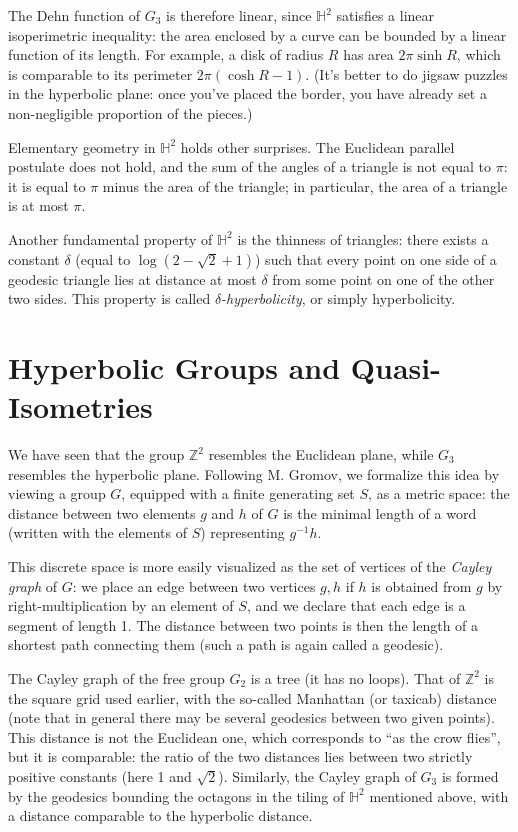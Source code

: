 \documentclass{amsart}
\begin{document}
The Dehn function of $G_3$ is therefore linear, since $\mathbb{H}^2$
satisfies a linear isoperimetric inequality: the area enclosed by a
curve can be bounded by a linear function of its length. For example,
a disk of radius $R$ has area $2\pi \sinh R$, which is comparable to its
perimeter $2\pi (\cosh R - 1)$. (It’s better to do jigsaw puzzles in
the hyperbolic plane: once you’ve placed the border, you have already
set a non-negligible proportion of the pieces.)

Elementary geometry in $\mathbb{H}^2$ holds other surprises. The
Euclidean parallel postulate does not hold, and the sum of the angles
of a triangle is not equal to $\pi$: it is equal to $\pi$ minus the
area of the triangle; in particular, the area of a triangle is at most
$\pi$.

Another fundamental property of $\mathbb{H}^2$ is the thinness of
triangles: there exists a constant $\delta$ (equal to
$\log(2 - \sqrt{2} + 1)$) such that every point on one side of a
geodesic triangle lies at distance at most $\delta$ from some point on
one of the other two sides. This property is called
\textit{$\delta$-hyperbolicity}, or simply hyperbolicity.

\section{Hyperbolic Groups and Quasi-Isometries}

We have seen that the group $\mathbb{Z}^2$ resembles the Euclidean
plane, while $G_3$ resembles the hyperbolic plane. Following
M. Gromov, we formalize this idea by viewing a group $G$, equipped
with a finite generating set $S$, as a metric space: the distance
between two elements $g$ and $h$ of $G$ is the minimal length of a
word (written with the elements of $S$) representing $g^{-1}h$.

This discrete space is more easily visualized as the set of vertices
of the \textit{Cayley graph} of $G$: we place an edge between two vertices
$g, h$ if $h$ is obtained from $g$ by right-multiplication by an
element of $S$, and we declare that each edge is a segment of length
1. The distance between two points is then the length of a shortest
path connecting them (such a path is again called a geodesic).

The Cayley graph%
of the free group $G_2$ is a tree (it has no loops). That of
$\mathbb{Z}^2$ is the square grid used earlier, with the so-called Manhattan
(or taxicab) distance (note that in general there may be several
geodesics between two given points). This distance is not the
Euclidean one, which corresponds to ``as the crow flies'', but it is
comparable: the ratio of the two distances lies between two strictly
positive constants (here 1 and $\sqrt{2}$). Similarly, the Cayley
graph of $G_3$ is formed by the geodesics bounding the octagons in the
tiling of $\mathbb{H}^2$ mentioned above, with a distance comparable
to the hyperbolic distance.
\end{document}
